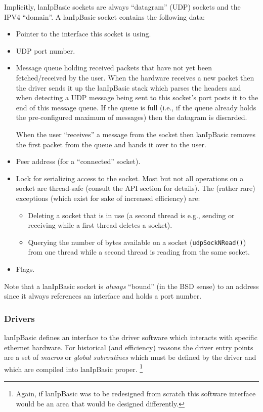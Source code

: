 \documentclass{article}
\newcommand{\lip}{lanIpBasic}
\newcommand{\ethn}{ethernet}
\newcommand{\lipc}[1]{{\tt #1}}
\begin{document}
Implicitly, \lip{} sockets are always ``datagram'' (UDP) sockets
and the IPV4 ``domain''. A \lip{} socket contains the following
data:
\begin{itemize}
\item Pointer to the interface this socket is using.
\item UDP port number.
\item Message queue holding received packets that have not yet been
      fetched/received by the user. When the hardware receives a new
      packet then the driver sends it up the \lip{} stack which parses
      the headers and when detecting a UDP message being sent to this
      socket's port posts it to the end of this message queue. If the
      queue is full (i.e., if the queue already holds the pre-configured
      maximum of messages) then the datagram is discarded.

      When the user ``receives'' a message from the socket then
      \lip{} removes the first packet from the queue and hands
      it over to the user.
\item Peer address (for a ``connected'' socket).
\item Lock for serializing access to the socket. Most but not all
      operations on a socket are thread-safe (consult the API section
      for details). The (rather rare) exceptions
      (which exist for sake of increased efficiency) are:
      \begin{itemize}
        \item Deleting a socket that is in use (a second thread is
              e.g., sending or receiving while a first thread deletes
              a socket).
        \item Querying the number of bytes available on a socket
              (\lipc{udpSockNRead()})
              from one thread while a second thread is reading from
              the same socket.
      \end{itemize}
\item Flags.
\end{itemize}
Note that a \lip{} socket is {\em always} ``bound'' (in the BSD sense)
 to an address since it always references an interface and holds a port number.

    \subsubsection{Drivers}
\lip{} defines an interface to the driver software
which interacts with specific \ethn{} hardware.
For historical (and efficiency) reasons the driver entry points are
a set of {\em macros} or {\em global subroutines}
which must be defined by the
driver and which are compiled into \lip{} proper.%
\footnote{
Again, if \lip{} was to be redesigned from scratch
this software interface would be an area that would be designed
differently.}
\end{document}
